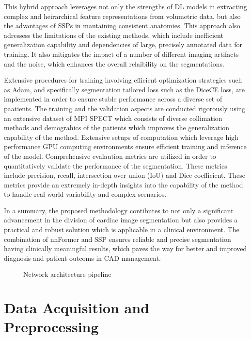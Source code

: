 This hybrid approach leverages not only the strengths of DL models in extracting complex and heirarchical feature representations from volumetric data, but also the advantages of SSPs in mantaining consistent anatomies. This approach also adressess the limitations of the existing methods, which include inefficient generalization capability and dependencies of large, precisely annotated data for training. It also mitigates the impact of a number of different imaging artifacts and the noise, which enhances the overall relaibility on the segmentations.

Extensive procedures for training involving efficient optimization strategies such as Adam, and specifically segmentation tailored loss such as the DiceCE loss, are implemented in order to ensure stable performance across a diverse set of paatients. The training and the validation aspects are conducted rigorously using an extensive dataset of MPI SPECT which consists of diverse collimation methods and demograhics of the patients which improves the generalization capability of the method. Extensive setups of computation which leverage high performance GPU computing environments ensure efficient training and inference of the model. Comprehensive evalaution metrics are utilized in order to quantitatively validate the performance of the segmentation. These metrics include precision, recall, intersection over union (IoU) and Dice coefficient. These metrics provide an extremely in-depth insights into the capability of the method to handle real-world variability and complex scenarios.

In a summary, the proposed methodology contibutes to not only a significant advancement in the division of cardiac image segmentation but also provides a practical and robust solution which is applicable in a clinical environment. The combination of nnFormer and SSP ensures reliable and precise segmentation having clinically meaningful results, which paves the way for better and improved diagnosis and patient outcoms in CAD management.

\begin{figure}[htb!]  %
    \centering
	\centering
	\resizebox{1\textwidth}{!}{
		
	}
	\caption{\centering Network architecture pipeline}
	\label{Fig:network_pipeline}
\end{figure}

\section{Data Acquisition and Preprocessing}

